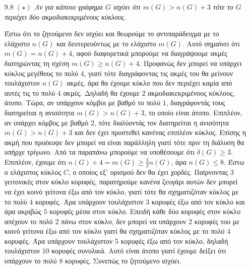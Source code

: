 \documentclass[a4paper, oneside, 11pt]{article}
\theoremstyle{definition}
\begin{document}
\begin{enumerate}
\begin{itemize}
   \end{itemize}

	\item[9.8] \emph{$(\star)$ Αν για κάποιο γράφημα $G$ ισχύει ότι $m(G)>n(G)+3$ τότε το $G$ περιέχει δύο ακμοδιακεκριμένους κύκλους.}

Έστω ότι το ζητούμενο δεν ισχύει και θεωρούμε το αντιπαράδειγμα με το ελάχιστο $n(G)$ και δευτερευόντως με το ελάχιστο $m(G)$. Αυτό σημαίνει ότι $m(G)=n(G)+4$, αφού διαφορετικά μπορούμε να διαγράψουμε
ακμές διατηρώντας τη σχέση $m(G)\geq n(G)+4$.
\newline
Προφανώς δεν μπορεί να υπάρχει κύκλος μεγέθους το πολύ $4$, γιατί τότε διαγράφοντας τις ακμές του θα μείνουν τουλάχιστον $n(G)$ ακμές, 
άρα θα έχουμε κύκλο που δεν περιέχει καμία από αυτές τις το πολύ $4$ ακμές. Δηλαδή θα 
έχουμε $2$ ακμοδιακεκριμένους κύκλους, άτοπο.
\newline
Τώρα, αν υπάρχουν κόμβοι με βαθμό το πολύ $1$, διαγράφοντάς τους διατηρείται η ανισότητα $m(G)>n(G)+3$, το οποίο είναι
άτοπο. Επιπλέον, αν υπάρχει κόμβος με βαθμό $2$, τότε διαλύοντάς τον διατηρείται η ανισότητα $m(G)>n(G)+3$ και δεν έχει προστεθεί κανένας επιπλέον κύκλος. Επίσης η ακμή 
που προέκυψε δεν μπορεί να είναι παράλληλη
γιατί τότε πριν τη διάλυση θα υπήρχε τρίγωνο. 
Από τα παραπάνω μπορούμε να υποθέσουμε ότι $\delta (G)\geq 3$. Επιπλέον, έχουμε ότι $n(G)+4 = m(G)\geq \frac{3}{2} n(G)$, άρα $n(G)\leq 8$. 
\newline
Έστω ο ελάχιστος κύκλος $C$, ο οποίος εξ' ορισμού 
δεν θα έχει χορδές.
Παίρνοντας 3 γειτονικές στον κύκλο κορυφές, παρατηρούμε κανένα ζευγάρι αυτών
δεν μπορεί να έχει κοινό γείτονα έξω από τον κύκλο, γιατί τότε θα σχηματιζόταν κύκλος με το πολύ $4$ κορυφές. Άρα υπάρχουν τουλάχιστον $3$
κορυφές έξω από τον κύκλο και άρα ακριβώς $5$ κορυφές μέσα στον κύκλο. Επειδή κάθε δύο κορυφές στον κύκλο απέχουν το πολύ 2 πάνω στον κύκλο, δεν μπορεί να υπάρχουν 2 κορυφές του με κοινό γείτονα έξω
από τον κύκλο γιατί θα σχηματιζόταν κύκλος με το πολύ $4$ κορυφές. Άρα υπάρχουν τουλάχιστον $5$ κορυφές έξω από τον κύκλο, δηλαδή τουλάχιστον $10$ κορυφές συνολικά. Αυτό είναι άτοπο γιατί έχουμε δείξει
ότι υπάρχουν το πολύ $8$ κορυφές.
Συνεπώς το ζητούμενο ισχύει.



\end{enumerate}
\end{document}
